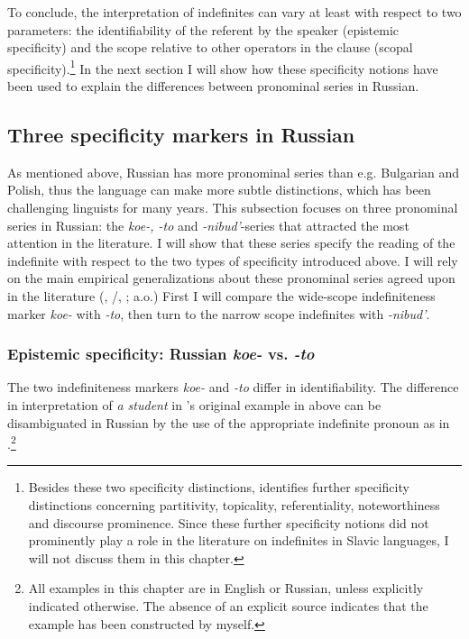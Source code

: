 \documentclass[output=paper,colorlinks,citecolor=brown]{langscibook}
\begin{document}
To conclude, the interpretation of indefinites can vary at least with respect to two parameters: the identifiability of the referent by the speaker (epistemic specificity) and the scope relative to other operators in the clause (scopal specificity).\footnote{Besides these two specificity distinctions, \citet{vonHeusinger2011} identifies further specificity distinctions concerning partitivity, topicality, referentiality, noteworthiness and discourse prominence. Since these further specificity notions did not prominently play a role in the literature on indefinites in Slavic languages, I will not discuss them in this chapter.} In the next section I will show how these specificity notions have been used to explain the differences between pronominal series in Russian. 

\subsection{Three specificity markers in Russian}\label{geist:sec:2.2}

As mentioned above, Russian has more pronominal series than e.g. Bulgarian and Polish, thus the language can make more subtle distinctions, which has been challenging linguists for many years. This subsection focuses on three pronominal series in Russian: the \textit{koe-, -to} and \textit{-nibud’}-series that attracted the most attention in the literature. I will show that these series specify the reading of the indefinite with respect to the two types of specificity introduced above. I will rely on the main empirical generalizations about these pronominal series agreed upon in the literature (\citealt{Dahl1970}, \citealt{Paduceva1985}/\citeyear{Paduceva2010}, \citealt{Haspelmath1997,Pereltsvaig2004,Pereltsvaig2008,Yanovich2005,Geist2008,Kagan2011,Onea.Geist2011}; a.o.) First I will compare the wide-scope indefiniteness marker \textit{koe-} with \textit{-to}, then turn to the narrow scope indefinites with \textit{-nibud’}.

\largerpage[2]
\subsubsection{Epistemic specificity: Russian \textit{koe-} vs. \textit{-to}}


The two indefiniteness markers \textit{koe-} and \textit{-to} differ in identifiability. The difference in interpretation of \textit{a student} in \citeauthor{Fodor.Sag1982}'s \citeyear{Fodor.Sag1982} original example in  above can be disambiguated in Russian by the use of the appropriate indefinite pronoun as in .\footnote{All examples in this chapter are in English or Russian, unless explicitly indicated otherwise. The absence of an explicit source indicates that the example has been constructed by myself.}
\end{document}
